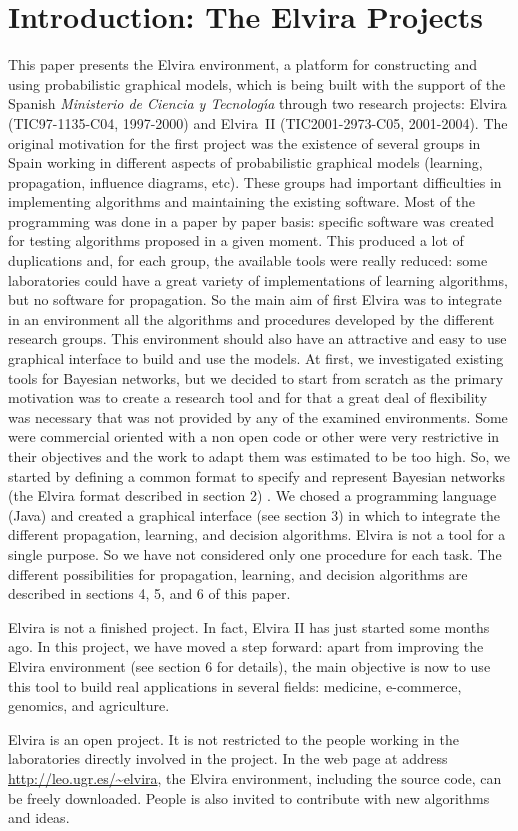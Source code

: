 \section{Introduction: The Elvira Projects}

This paper presents the Elvira environment, a platform for constructing and using probabilistic graphical models,
which is being built with the support of the Spanish  
{\em Ministerio de Ciencia y Tecnolog\'{\i}a} through two
research projects: Elvira (TIC97-1135-C04, 1997-2000) and Elvira~II
(TIC2001-2973-C05, 2001-2004). The original motivation for the
first project was the existence of several groups in Spain working
in different aspects of probabilistic graphical models  (learning,
propagation, influence diagrams, etc). These groups had important
difficulties in implementing algorithms and maintaining the
existing software. Most of the programming was done in a paper by
paper basis: specific software was created for testing algorithms
proposed in a given moment. This produced a lot of duplications
and, for each group, the available tools were really reduced: some
laboratories could have a great variety of implementations of
learning algorithms, but no  software for propagation. So the main
aim of first Elvira was to integrate in an environment all the
algorithms and procedures developed by the different research
groups. This environment should also have an attractive and easy to
use graphical interface to build and use the models. At first, we
investigated existing tools for Bayesian networks, but we decided
to start from scratch as the primary motivation was to create a
research tool and for that a great deal of flexibility was
necessary that was not provided by any of the examined
environments. Some were commercial oriented with a non open code or
other were very restrictive in their objectives and the work
to adapt them was estimated to be too high. So, we started by
defining a common format to specify and represent Bayesian networks 
(the Elvira format described in section 2) . We chosed a
programming language (Java) and  created a graphical interface 
(see section 3)  in which to integrate the different propagation,
learning, and decision algorithms. Elvira is not a tool for a 
single purpose. So we have not considered only one procedure for
each task. The different possibilities for propagation, learning, and decision algorithms  are described in 
sections 4, 5, and 6 of this paper.

Elvira is not a finished project. In fact, 
Elvira II has just started some months ago. In this project, we
have moved a step forward: apart from improving the
Elvira environment (see section 6 for details), the main objective is now to use this tool to build real applications in several fields: medicine, 
e-commerce, genomics, and agriculture.

Elvira is an open project. It is not restricted to the people working in the laboratories directly involved in the project.
In the web page at address \url{http://leo.ugr.es/~elvira}, the Elvira environment, including the source code, can be freely downloaded.
People is also invited to contribute with new algorithms and ideas.

